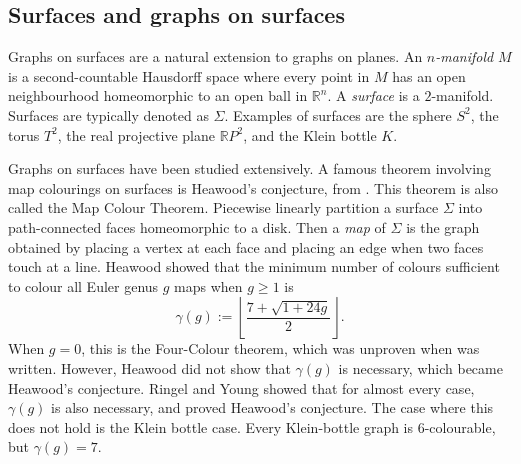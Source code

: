 \subsection{Surfaces and graphs on surfaces}
Graphs on surfaces are a natural extension to graphs on planes.
An \textit{$n$-manifold} $M$ is a second-countable Hausdorff space where every point in $M$ has an open neighbourhood homeomorphic to an open ball in $\mathbb{R}^n$.  
A \textit{surface} is a $2$-manifold. Surfaces are typically denoted as $\Sigma$. Examples of surfaces are the sphere $S^2$, the torus $T^2$, the real projective plane $\mathbb{R}P^2$, and the Klein bottle $K$. 

Graphs on surfaces have been studied extensively. A famous theorem involving map colourings on surfaces is Heawood's conjecture, from \textcite{heawoodMapcolourTheorem1890}. This theorem is also called the Map Colour Theorem. Piecewise linearly partition a surface $\Sigma$ into path-connected faces homeomorphic to a disk. Then a \textit{map} of $\Sigma$ is the graph obtained by placing a vertex at each face and placing an edge when two faces touch at a line. Heawood showed that the minimum number of colours sufficient to colour all Euler genus $g$ maps when $g \geq 1$ is
	\begin{equation*}
		\gamma(g) := \left\lfloor 
		\frac{7 + \sqrt{1 + 24g}}{2}
		\right\rfloor.
	\end{equation*}
When $g = 0$, this is the Four-Colour theorem, which was unproven when \textcite{ringelMapColorTheorem1974} was written.  
However, Heawood did not show that $\gamma(g)$ is necessary, which became Heawood's conjecture. 
Ringel and Young \cite{ringelMapColorTheorem1974} showed that for almost every case, $\gamma(g)$ is also necessary, and proved Heawood's conjecture. The case where this does not hold is the Klein bottle case. Every Klein-bottle graph is $6$-colourable, but $\gamma(g) = 7$. 